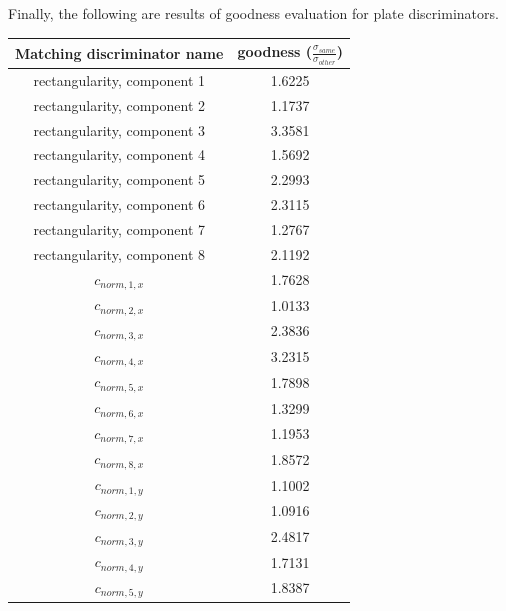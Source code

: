 \documentclass[times, utf8, zavrsni]{fer}
\begin{document}
Finally, the following are results of goodness evaluation for plate
discriminators.

\begin{table}[!ht]
\begin{center} {\footnotesize
\begin{tabular}{c|c}
Matching discriminator name & goodness
($\frac{\sigma_{same}}{\sigma_{other}}$) \\
\hline
rectangularity, component 1                     &    1.6225 \\ 
rectangularity, component 2                     &    1.1737 \\ 
rectangularity, component 3                     &    3.3581 \\ 
rectangularity, component 4                     &    1.5692 \\ 
rectangularity, component 5                     &    2.2993 \\ 
rectangularity, component 6                     &    2.3115 \\ 
rectangularity, component 7                     &    1.2767 \\ 
rectangularity, component 8                     &    2.1192 \\ 
$c_{norm, 1, x}$                                &    1.7628 \\ 
$c_{norm, 2, x}$                                &    1.0133 \\ 
$c_{norm, 3, x}$                                &    2.3836 \\ 
$c_{norm, 4, x}$                                &    3.2315 \\ 
$c_{norm, 5, x}$                                &    1.7898 \\
$c_{norm, 6, x}$                                &    1.3299 \\
$c_{norm, 7, x}$                                &    1.1953 \\
$c_{norm, 8, x}$                                &    1.8572 \\
$c_{norm, 1, y}$                                &    1.1002 \\
$c_{norm, 2, y}$                                &    1.0916 \\
$c_{norm, 3, y}$                                &    2.4817 \\
$c_{norm, 4, y}$                                &    1.7131 \\
$c_{norm, 5, y}$                                &    1.8387 \\

\end{tabular}}
\end{center}
\end{table}
\end{document}
